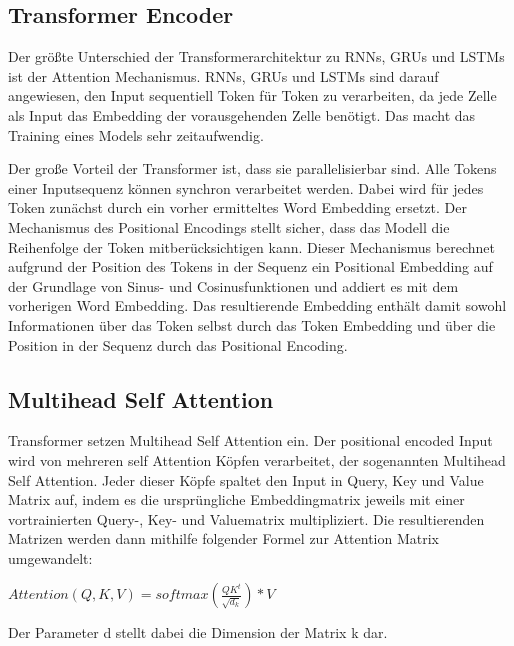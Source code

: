 \subsection{Transformer Encoder}

Der größte Unterschied der Transformerarchitektur zu RNNs, GRUs und LSTMs ist der Attention Mechanismus.
RNNs, GRUs und LSTMs sind darauf angewiesen, den Input sequentiell Token für Token zu verarbeiten, da jede Zelle als Input das Embedding der vorausgehenden Zelle benötigt.
Das macht das Training eines Models sehr zeitaufwendig.

Der große Vorteil der Transformer ist, dass sie parallelisierbar sind.
Alle Tokens einer Inputsequenz können synchron verarbeitet werden. 
Dabei wird für jedes Token zunächst durch ein vorher ermitteltes Word Embedding ersetzt.
Der Mechanismus des Positional Encodings stellt sicher, dass das Modell die Reihenfolge der Token mitberücksichtigen kann.
Dieser Mechanismus berechnet aufgrund der Position des Tokens in der Sequenz ein Positional Embedding auf der Grundlage von Sinus- und Cosinusfunktionen und addiert es mit dem vorherigen Word Embedding.
Das resultierende Embedding enthält damit sowohl Informationen über das Token selbst durch das Token Embedding und über die Position in der Sequenz durch das Positional Encoding.


\subsection{Multihead Self Attention}

Transformer setzen Multihead Self Attention ein. 
Der positional encoded Input wird von mehreren self Attention Köpfen verarbeitet, der sogenannten Multihead Self Attention. 
Jeder dieser Köpfe spaltet den Input in Query, Key und Value Matrix auf, indem es die ursprüngliche Embeddingmatrix jeweils mit einer vortrainierten Query-, Key- und Valuematrix multipliziert.
Die resultierenden Matrizen werden dann mithilfe folgender Formel zur Attention Matrix umgewandelt:

$Attention(Q,K,V)=softmax(\frac{QK^t}{\sqrt{d_k}})*V$

Der Parameter d stellt dabei die Dimension der Matrix k dar.

